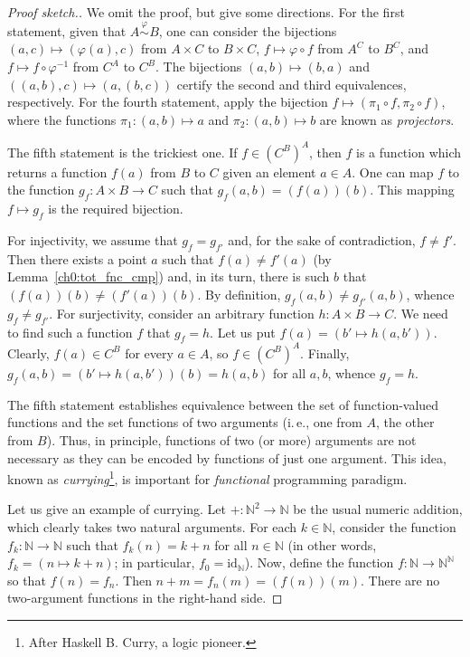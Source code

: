 \documentclass[12pt,notitlepage]{article}
\theoremstyle{plain}
\theoremstyle{definition}
\theoremstyle{plain}
\newcommand{\N}{\mathbb{N}}
\renewcommand{\phi}{\varphi}
\newcommand{\id}{\mathrm{id}}
\newcommand{\1}{\mathbf{1}}
\newcommand{\0}{\mathbf{0}}
\begin{document}
\begin{proof}[Proof sketch.]
We omit the proof, but give some directions. For the first statement, given that $A \stackrel{\phi}{\sim} B$, one can consider the bijections $(a,c) \mapsto (\phi(a),c)$ from $A \times C$ to $B \times C$, $f \mapsto \phi \circ f$ from $A^C$ to $B^C$, and $f \mapsto f \circ \phi^{-1}$ from $C^A$ to $C^B$. The bijections $(a,b) \mapsto (b,a)$ and $((a,b),c) \mapsto (a,(b,c))$ certify the second and third equivalences, respectively. For the fourth statement, apply the bijection $f \mapsto (\pi_1 \circ f, \pi_2 \circ f)$, where the functions $\pi_1 \colon (a,b) \mapsto a$ and $\pi_2 \colon (a,b) \mapsto b$ are known as \emph{projectors}.

The fifth statement is the trickiest one. If $f \in (C^B)^A$, then $f$ is a function which returns a function $f(a)$ from $B$ to $C$ given an element $a \in A$. One can map $f$ to the function $g_f\colon A \times B \to C$ such that $g_f(a,b) = (f(a))(b)$. This mapping $f \mapsto g_f$ is the required bijection.

For injectivity, we assume that $g_f = g_{f'}$ and, for the sake of contradiction, $f \neq f'$. Then there exists a point $a$ such that $f(a) \neq f'(a)$ (by Lemma~\ref{ch0:tot_fnc_cmp}) and, in its turn, there is such $b$ that $(f(a))(b) \neq (f'(a))(b)$. By definition, $g_f(a,b) \neq g_{f'}(a,b)$, whence $g_f \neq g_{f'}$. For surjectivity, consider an arbitrary function $h\colon A \times B \to C$. We need to find such a function $f$ that $g_f = h$. Let us put $f(a) = (b' \mapsto h(a,b'))$. Clearly, $f(a) \in C^B$ for every $a \in A$, so $f \in (C^B)^A$. Finally, $g_f(a,b) = (b' \mapsto h(a,b'))(b) = h(a,b)$ for all $a, b$, whence $g_f = h$.

The fifth statement establishes equivalence between the set of function-valued functions and the set functions of two arguments (i.\,e., one from $A$, the other from $B$). Thus, in principle, functions of two (or more) arguments are not necessary as they can be encoded by functions of just one argument. This idea, known as \emph{currying}\footnote{After Haskell B. Curry, a logic pioneer.}, is important for \emph{functional} programming paradigm.

Let us give an example of currying. Let ${+}\colon \N^2 \to \N$ be the usual numeric addition, which clearly takes two natural arguments. For each $k \in \N$, consider the function $f_k\colon \N \to \N$ such that $f_k(n) = k + n$ for all $n \in \N$ (in other words, $f_k = (n \mapsto k + n)$; in particular, $f_0 = \id_\N$). Now, define the function $f\colon \N \to \N^\N$ so that $f(n) = f_n$. Then $n + m = f_n(m) = (f(n))(m)$. There are no two-argument functions in the right-hand side.
\end{proof}
\end{document}
